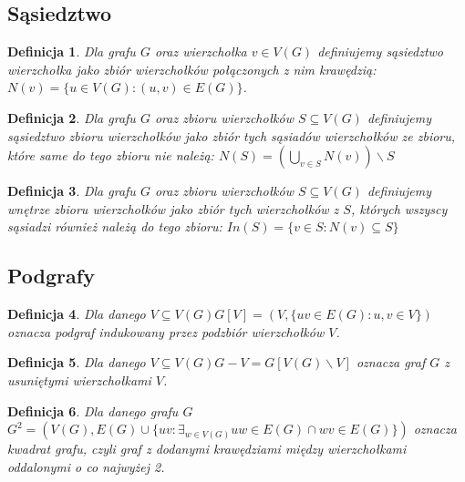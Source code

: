 \documentclass{pracamgr}
\newtheorem{defi}{Definicja}[section] %
\begin{document}
   \subsection{Sąsiedztwo}
    \begin{defi}\label{sasiedztwo wierzcholka}
     Dla grafu $G$ oraz wierzchołka $v\in V(G)$ definiujemy \emph{sąsiedztwo wierzchołka} jako zbiór wierzchołków połączonych z nim krawędzią:
     $N(v)=\{u\in V(G):(u,v)\in E(G)\}$.
    \end{defi}
    \begin{defi}\label{sasiedztwo zbioru wierzcholkow}%
     Dla grafu $G$ oraz zbioru wierzchołków $S\subseteq V(G)$ definiujemy \emph{sąsiedztwo zbioru wierzchołków} jako zbiór tych sąsiadów wierzchołków ze zbioru,
     które same do tego zbioru nie należą: $N(S)=(\bigcup_{v\in S}N(v))\backslash S$
    \end{defi}
    \begin{defi}\label{wnetrze zbioru wierzcholkow}
     Dla grafu $G$ oraz zbioru wierzchołków $S\subseteq V(G)$ definiujemy \emph{wnętrze zbioru wierzchołków} jako zbiór tych wierzchołków z $S$,
     których wszyscy sąsiadzi również należą do tego zbioru: $In(S)=\{v\in S:N(v)\subseteq S\}$
    \end{defi}
   \subsection{Podgrafy}
    \begin{defi}\label{podgraf indukowany}
     Dla danego $V\subseteq V(G)$\quad $G[V]=(V,\{uv\in E(G):u,v\in V\})$ oznacza \emph{podgraf indukowany} przez podzbiór wierzchołków $V$.
    \end{defi}
    \begin{defi}\label{roznica grafow}
     Dla danego $V\subseteq V(G)$\quad $G-V=G[V(G)\backslash V]$ oznacza \emph{graf $G$ z usuniętymi wierzchołkami $V$}.
    \end{defi}
    \begin{defi}\label{kwadrat grafu}
     Dla danego grafu $G$\newline $G^2=(V(G),E(G)\cup\{uv:\exists_{w\in V(G)}uw\in E(G)\cap wv\in E(G)\})$
     oznacza \emph{kwadrat grafu}, czyli graf z dodanymi krawędziami między wierzchołkami oddalonymi o co najwyżej 2.
    \end{defi}
\end{document}
